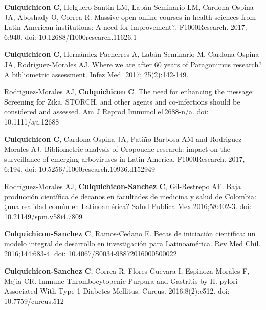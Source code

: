 \documentclass[10pt]{article}
\begin{document}
\begin{etaremune}
	\item {\bf Culquichicon C}, Helguero-Santin LM, Labán-Seminario LM, Cardona-Ospina JA, Aboshady O, Correa R. Massive open online courses in health sciences from Latin American institutions: A need for improvement?. F1000Research. 2017; 6:940. doi: 10.12688/f1000research.11626.1 \\
	\vspace{-0.23in}

	\item {\bf Culquichicon C}, Hernández-Pacherres A, Labán-Seminario M, Cardona-Ospina JA, Rodríguez-Morales AJ. Where we are after 60 years of Paragonimus research? A bibliometric assessment. Infez Med. 2017; 25(2):142-149. \\
	\vspace{-0.23in}

	\item Rodriguez-Morales AJ, {\bf Culquichicon C}. The need for enhancing the message: Screening for Zika, STORCH, and other agents and co-infections should be considered and assessed. Am J Reprod Immunol.e12688-n/a. doi: 10.1111/aji.12688 \\
	\vspace{-0.23in}

	\item {\bf Culquichicon C}, Cardona-Ospina JA, Patiño-Barbosa AM and Rodriguez-Morales AJ. Bibliometric analysis of Oropouche research: impact on the surveillance of emerging arboviruses in Latin America. F1000Research. 2017, 6:194. doi: 10.5256/f1000research.10936.d152949 \\
	\vspace{-0.23in}

	\item Rodríguez-Morales AJ, {\bf Culquichicon-Sanchez C}, Gil-Restrepo AF. Baja producción científica de decanos en facultades de medicina y salud de Colombia:¿una realidad común en Latinoamérica? Salud Publica Mex.2016;58:402-3. doi: 10.21149/spm.v58i4.7809 \\
	\vspace{-0.23in}

	\item {\bf Culquichicon-Sanchez C}, Ramos-Cedano E. Becas de iniciación científica: un modelo integral de desarrollo en investigación para Latinoamérica. Rev Med Chil. 2016;144:683-4. doi: 10.4067/S0034-98872016000500022 \\
	\vspace{-0.23in}

	\item {\bf Culquichicon-Sanchez C}, Correa R, Flores-Guevara I, Espinoza Morales F, Mejia CR. Immune Thrombocytopenic Purpura and Gastritis by H. pylori Associated With Type 1 Diabetes Mellitus. Cureus. 2016;8(2):e512. doi: 10.7759/cureus.512 \\
	\vspace{-0.23in}


\end{etaremune}
\end{document}

